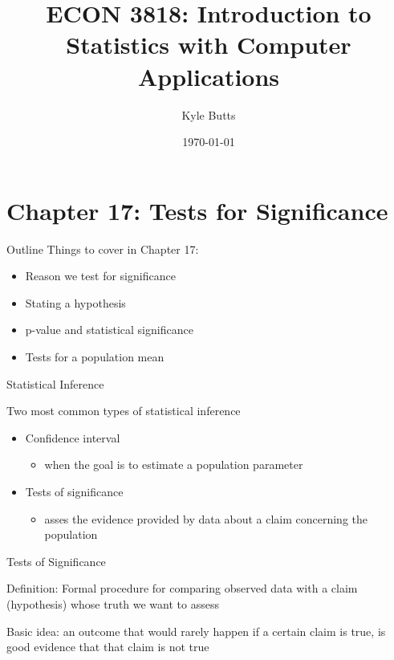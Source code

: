 \documentclass{beamer}
\title{ECON 3818: Introduction to Statistics with Computer Applications}
\date{\today}
\author{Kyle Butts}
\begin{document}
\maketitle




\section{Chapter 17: Tests for Significance}

\begin{frame}{Outline}
	Things to cover in Chapter 17: 
	\begin{itemize}
		\item Reason we test for significance
		\item Stating a hypothesis
		\item p-value and statistical significance
		\item Tests for a population mean
	\end{itemize}
\end{frame}

\begin{frame}{Statistical Inference}
	
	Two most common types of statistical inference
	\begin{itemize}
		\item Confidence interval
		      \begin{itemize}
		      	\item when the goal is to estimate a population parameter
		      \end{itemize}
		\item Tests of significance
		      \begin{itemize}
		      	\item asses the evidence provided by data about a claim concerning the population
		      \end{itemize}
	\end{itemize}
	
\end{frame}

\begin{frame}{Tests of Significance}
	
	\alert{Definition}: Formal procedure for comparing observed data with a claim (hypothesis) whose truth we want to assess

	Basic idea: an outcome that would rarely happen if a certain claim is true, is good evidence that that claim is not true 
	
\end{frame}
\end{document}
